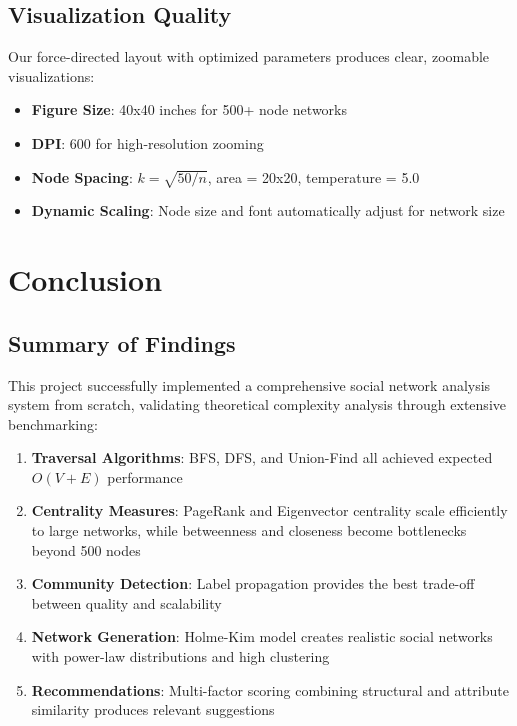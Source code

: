 \documentclass[12pt,a4paper]{article}
\begin{document}
\subsection{Visualization Quality}

Our force-directed layout with optimized parameters produces clear, zoomable visualizations:
\begin{itemize}
    \item \textbf{Figure Size}: 40x40 inches for 500+ node networks
    \item \textbf{DPI}: 600 for high-resolution zooming
    \item \textbf{Node Spacing}: $k = \sqrt{50/n}$, area = 20x20, temperature = 5.0
    \item \textbf{Dynamic Scaling}: Node size and font automatically adjust for network size
\end{itemize}

\section{Conclusion}

\subsection{Summary of Findings}

This project successfully implemented a comprehensive social network analysis system from scratch, validating theoretical complexity analysis through extensive benchmarking:

\begin{enumerate}
    \item \textbf{Traversal Algorithms}: BFS, DFS, and Union-Find all achieved expected $O(V + E)$ performance
    \item \textbf{Centrality Measures}: PageRank and Eigenvector centrality scale efficiently to large networks, while betweenness and closeness become bottlenecks beyond 500 nodes
    \item \textbf{Community Detection}: Label propagation provides the best trade-off between quality and scalability
    \item \textbf{Network Generation}: Holme-Kim model creates realistic social networks with power-law distributions and high clustering
    \item \textbf{Recommendations}: Multi-factor scoring combining structural and attribute similarity produces relevant suggestions
\end{enumerate}
\end{document}
